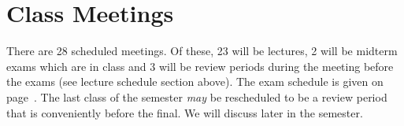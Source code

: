 
\section*{Class Meetings}

There are 28 scheduled meetings. Of these, 23 will be lectures, 2 will be midterm exams which are in class and 3 will be review periods during the meeting before the exams (see lecture schedule section above). The exam schedule is given on page~\pageref{subsec:exam_schedule}. The last class of the semester \textit{may} be rescheduled to be a review period that is conveniently before the final. We will discuss later in the semester. %